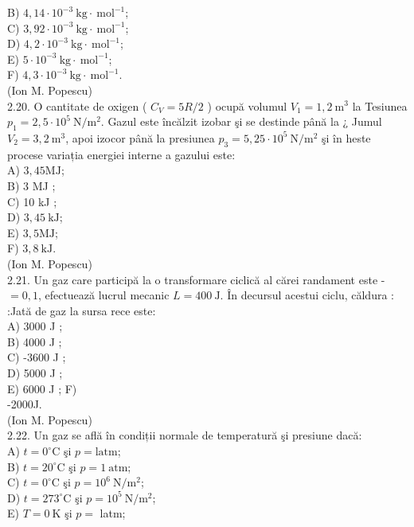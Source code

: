 B) $4,14 \cdot 10^{-3} \mathrm{~kg} \cdot \mathrm{~mol}^{-1}$;\\
C) $3,92 \cdot 10^{-3} \mathrm{~kg} \cdot \mathrm{~mol}^{-1}$;\\
D) $4,2 \cdot 10^{-3} \mathrm{~kg} \cdot \mathrm{~mol}^{-1}$;\\
E) $5 \cdot 10^{-3} \mathrm{~kg} \cdot \mathrm{~mol}^{-1}$;\\
F) $4,3 \cdot 10^{-3} \mathrm{~kg} \cdot \mathrm{~mol}^{-1}$.\\
(Ion M. Popescu)\\
2.20. O cantitate de oxigen ( $C_{V}=5 R / 2$ ) ocupă volumul $V_{1}=1,2 \mathrm{~m}^{3}$ la Tesiunea $p_{1}=2,5 \cdot 10^{5} \mathrm{~N} / \mathrm{m}^{2}$. Gazul este încălzit izobar şi se destinde până la ¿ Jumul $V_{2}=3,2 \mathrm{~m}^{3}$, apoi izocor până la presiunea $p_{3}=5,25 \cdot 10^{5} \mathrm{~N} / \mathrm{m}^{2}$ şi în heste procese variația energiei interne a gazului este:\\
A) $3,45 \mathrm{MJ}$;\\
B) 3 MJ ;\\
C) 10 kJ ;\\
D) $3,45 \mathrm{~kJ}$;\\
E) $3,5 \mathrm{MJ}$;\\
F) $3,8 \mathrm{~kJ}$.\\
(Ion M. Popescu)\\
2.21. Un gaz care participă la o transformare ciclică al cărei randament este - $=0,1$, efectuează lucrul mecanic $L=400 \mathrm{~J}$. În decursul acestui ciclu, căldura : :Jată de gaz la sursa rece este:\\
A) 3000 J ;\\
B) 4000 J ;\\
C) -3600 J ;\\
D) 5000 J ;\\
E) 6000 J ; F)\\
-2000J.\\
(Ion M. Popescu)\\
2.22. Un gaz se află în condiții normale de temperatură şi presiune dacă:\\
A) $t=0^{\circ} \mathrm{C}$ şi $p=\mathrm{latm}$;\\
B) $t=20^{\circ} \mathrm{C}$ şi $p=1 \mathrm{~atm}$;\\
C) $t=0^{\circ} \mathrm{C}$ şi $p=10^{6} \mathrm{~N} / \mathrm{m}^{2}$;\\
D) $t=273^{\circ} \mathrm{C}$ şi $p=10^{5} \mathrm{~N} / \mathrm{m}^{2}$;\\
E) $T=0 \mathrm{~K}$ şi $p=$ latm;\\
